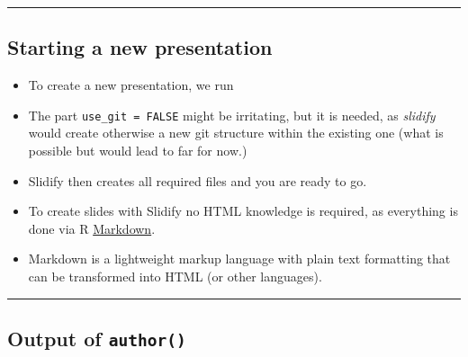 \begin{center}\rule{0.5\linewidth}{\linethickness}\end{center}

\subsection{Starting a new
presentation}\label{starting-a-new-presentation}

\begin{itemize}
\tightlist
\item
  To create a new presentation, we run
\end{itemize}

\begin{Shaded}
\begin{Highlighting}[]
\NormalTok{(}\NormalTok{)}
\NormalTok{(}\NormalTok{)}
\NormalTok{(}\NormalTok{, } \NormalTok{)}
\end{Highlighting}
\end{Shaded}

\begin{itemize}
\item
  The part \texttt{use\_git\ =\ FALSE} might be irritating, but it is
  needed, as \emph{slidify} would create otherwise a new git structure
  within the existing one (what is possible but would lead to far for
  now.)
\item
  Slidify then creates all required files and you are ready to go.
\item
  To create slides with Slidify no HTML knowledge is required, as
  everything is done via R
  \href{https://en.wikipedia.org/wiki/Markdown}{Markdown}.
\item
  Markdown is a lightweight markup language with plain text formatting
  that can be transformed into HTML (or other languages).
\end{itemize}

\begin{center}\rule{0.5\linewidth}{\linethickness}\end{center}

\subsection{\texorpdfstring{Output of
\texttt{author()}}{Output of author()}}\label{output-of-author}

